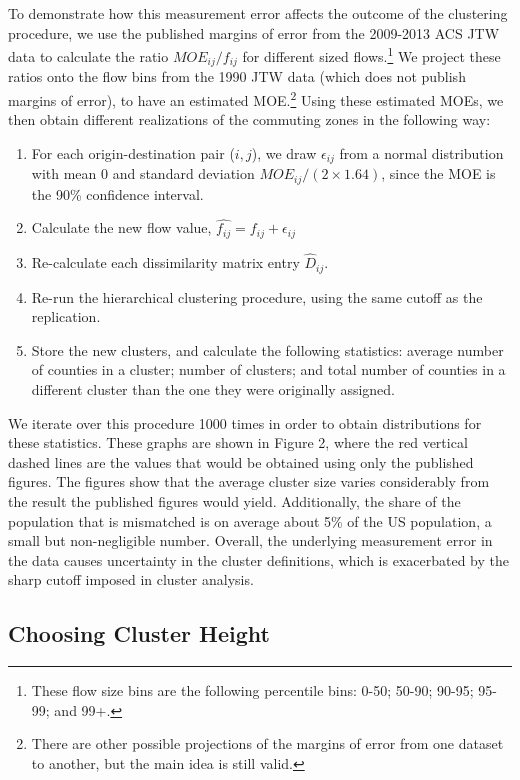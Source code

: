 To demonstrate how this measurement error affects the outcome of the clustering procedure, we use the published margins of error from the 2009-2013 ACS JTW data to calculate the ratio $MOE_{ij}/f_{ij}$ for different sized flows.\footnote{These flow size bins are the following percentile bins: 0-50; 50-90; 90-95; 95-99; and 99+.}  We project these ratios onto the flow bins from the 1990 JTW data (which does not publish margins of error), to have an estimated MOE.\footnote{There are other possible projections of the margins of error from one dataset to another, but the main idea is still valid.} Using these estimated MOEs, we then obtain different realizations of the commuting zones in the following way:

\begin{enumerate}
	\item For each origin-destination pair ($i,j$), we draw $\epsilon_{ij}$ from a normal distribution with mean 0 and standard deviation $MOE_{ij}/(2 \times 1.64)$, since the MOE is the 90\% confidence interval.
	\item Calculate the new flow value, $\hat{f_{ij}} = f_{ij} + \epsilon_{ij}$
	\item Re-calculate each dissimilarity matrix entry $\hat{D}_{ij}$. 
	\item Re-run the hierarchical clustering procedure, using the same cutoff as the replication.
	\item Store the new clusters, and calculate the following statistics: average number of counties in a cluster; number of clusters; and total number of counties in a different cluster than the one they were originally assigned.
\end{enumerate}

We iterate over this procedure 1000 times in order to obtain distributions for these statistics. These graphs are shown in Figure 2, where the red vertical dashed lines are the values that would be obtained using only the published figures. The figures show that the average cluster size varies considerably from the result the published figures would yield. Additionally, the share of the population that is mismatched is on average about 5\% of the US population, a small but non-negligible number. Overall, the underlying measurement error in the data causes uncertainty in the cluster definitions, which is exacerbated by the sharp cutoff imposed in cluster analysis.

\subsection{Choosing Cluster Height}

